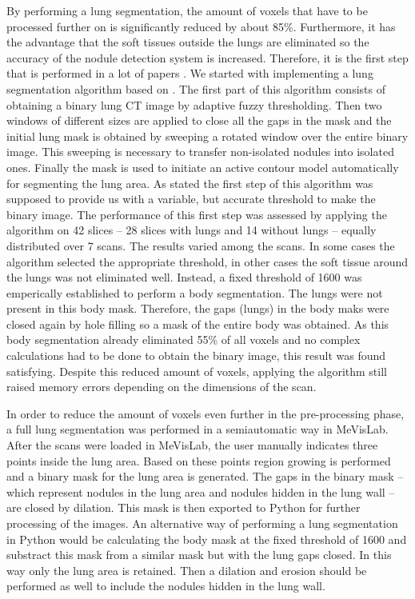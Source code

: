 By performing a lung segmentation, the amount of voxels that have to be
processed further on is significantly reduced by about 85\%. Furthermore, it has
the advantage that the soft tissues outside the lungs are eliminated so the
accuracy of the nodule detection system is increased. Therefore, it is the first
step that is performed in a lot of papers \cite{keshani, elbaz, teramoto}. We
started with implementing a lung segmentation algorithm based on \cite{keshani}.
The first part of this algorithm consists of obtaining a binary lung CT image by
adaptive fuzzy thresholding. Then two windows of different sizes are applied to
close all the gaps in the mask and the initial lung mask is obtained by sweeping
a rotated window over the entire binary image. This sweeping is necessary to
transfer non-isolated nodules into isolated ones. Finally the mask is used to
initiate an active contour model automatically for segmenting the lung area. As
stated the first step of this algorithm was supposed to provide us with a
variable, but accurate threshold to make the binary image. The performance of
this first step was assessed by applying the algorithm on 42 slices -- 28 slices
with lungs and 14 without lungs -- equally distributed over 7 scans. The results
varied among the scans. In some cases the algorithm selected the appropriate
threshold, in other cases the soft tissue around the lungs was not eliminated
well. Instead, a fixed threshold of 1600 was emperically established to perform a
body segmentation. The lungs were not present in this body mask. Therefore, the
gaps (lungs) in the body maks were closed again by hole filling so a mask of the
entire body was obtained. As this body segmentation already eliminated 55\% of
all voxels and no complex calculations had to be done to obtain the binary image, this
result was found satisfying. Despite this reduced amount of voxels, applying
the algorithm still raised memory errors depending on the dimensions of the scan.

 In order to reduce the amount of voxels even further in the pre-processing
 phase, a full lung segmentation was performed in a semiautomatic way in
 MeVisLab. After the scans were loaded in MeVisLab, the user manually indicates
 three points inside the lung area. Based on these points region growing is
 performed and a binary mask for the lung area is generated. The gaps in the
 binary mask -- which represent nodules in the lung area and nodules hidden in
 the lung wall -- are closed by dilation. This mask is then exported to Python
 for further processing of the images. An alternative way of performing a lung
 segmentation in Python would be calculating the body mask at the fixed
 threshold of 1600 and substract this mask from a similar mask but with the lung
 gaps closed. In this way only the lung area is retained. Then a dilation and
 erosion should be performed as well to include the nodules hidden in the lung
 wall.


